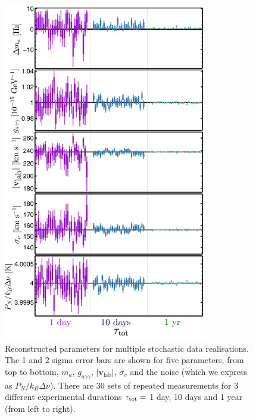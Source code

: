 \begin{figure}
\begin{center}
	\includegraphics[width=0.8\textwidth]{Figures/reconstructionvstau-eps-converted-to.pdf}
    \caption[Multiple reconstructed axion parameters]{Reconstructed parameters for multiple stochastic data realisations. The 1 and 2 sigma error bars are shown for five parameters, from top to bottom, $m_a$, $g_{a\gamma\gamma}$, $|\textbf{v}_\textrm{lab}|$, $\sigma_v$ and the noise (which we express as $P_N/k_B \Delta \nu$). There are 30 sets of repeated measurements for 3 different experimental durations $\tau_{\rm tot} = $ 1 day, 10 days and 1 year (from left to right).}\label{fig:reconstructionvstau}
\end{center}
\end{figure}

